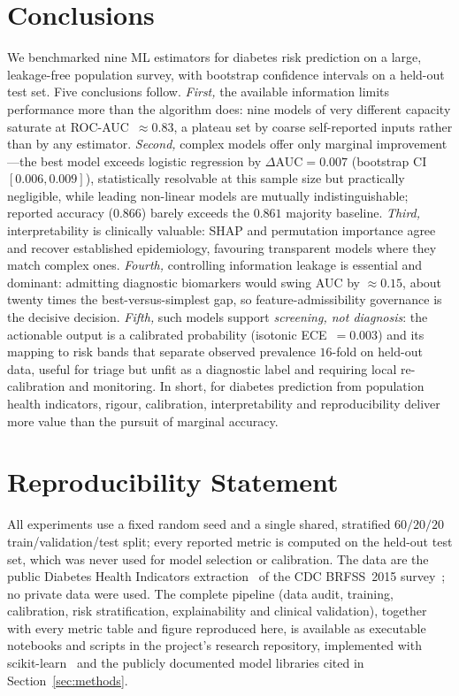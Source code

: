 \documentclass[conference]{IEEEtran}
\begin{document}
\section{Conclusions}
We benchmarked nine ML estimators for diabetes risk prediction on a large,
leakage-free population survey, with bootstrap confidence intervals on a held-out test
set. Five conclusions follow. \emph{First,} the available information limits performance
more than the algorithm does: nine models of very different capacity saturate at
ROC-AUC~$\approx0.83$, a plateau set by coarse self-reported inputs rather than by any
estimator. \emph{Second,} complex models offer only marginal improvement---the best model
exceeds logistic regression by $\Delta\text{AUC}=0.007$ (bootstrap CI $[0.006,0.009]$),
statistically resolvable at this sample size but practically negligible, while leading
non-linear models are mutually indistinguishable; reported accuracy ($0.866$) barely
exceeds the $0.861$ majority baseline. \emph{Third,} interpretability is clinically
valuable: SHAP and permutation importance agree and recover established epidemiology,
favouring transparent models where they match complex ones. \emph{Fourth,} controlling
information leakage is essential and dominant: admitting diagnostic biomarkers would swing
AUC by $\approx0.15$, about twenty times the best-versus-simplest gap, so
feature-admissibility governance is the decisive decision. \emph{Fifth,} such models
support \emph{screening, not diagnosis}: the actionable output is a calibrated probability
(isotonic ECE~$=0.003$) and its mapping to risk bands that separate observed prevalence
$16$-fold on held-out data, useful for triage but unfit as a diagnostic label and
requiring local re-calibration and monitoring. In short, for diabetes prediction from
population health indicators, rigour, calibration, interpretability and reproducibility
deliver more value than the pursuit of marginal accuracy.

\section*{Reproducibility Statement}
All experiments use a fixed random seed and a single shared, stratified $60/20/20$
train/validation/test split; every reported metric is computed on the held-out test set,
which was never used for model selection or calibration. The data are the public
Diabetes Health Indicators extraction~\cite{teboul2021dataset} of the CDC BRFSS~2015
survey~\cite{cdc2015brfss}; no private data were used. The complete pipeline (data
audit, training, calibration, risk stratification, explainability and clinical
validation), together with every metric table and figure reproduced here, is available
as executable notebooks and scripts in the project's research repository, implemented
with scikit-learn~\cite{pedregosa2011scikit} and the publicly documented model
libraries cited in Section~\ref{sec:methods}.



\end{document}
